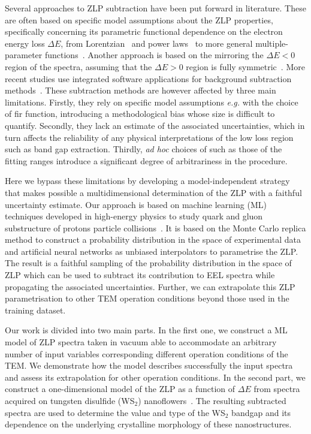 Several approaches to ZLP subtraction\cite{Rafferty:2000, Stoger:2008, Egerton:1996} have been put forward in literature.
%
These are often based on specific model assumptions about the ZLP properties, specifically
concerning its parametric functional dependence on the electron energy loss $\Delta E$,
from Lorentzian~\cite{Dorneich:1998}
and power laws~\cite{Erni:2005} to more general multiple-parameter functions~\cite{Benthem:2001}.
%
Another approach is based on the mirroring the $\Delta E <0$ region of the spectra, assuming
that the $\Delta E>0$ region is fully symmetric~\cite{Lazar:2003}.
%
More recent studies use integrated software applications for background subtraction 
methods~\cite{Egerton:10.1016/S0304-3991(01)00155-3, Held:2020, Granerod:2018, Fung:2020}.
%
These  subtraction methods are however affected by three main limitations.
%
Firstly, they rely on specific model assumptions {\it e.g.} with
the choice of fir function, introducing a methodological
bias whose size is difficult to quantify.
%
Secondly, they lack an estimate of the associated uncertainties, which in turn affects
the reliability of any physical interpretations of the low loss region such as
band gap extraction.
%
Thirdly, {\it ad hoc} choices of such as those of the fitting ranges introduce a significant degree of
arbitrariness in the procedure.

Here we bypass these limitations by developing a model-independent strategy
that makes possible a multidimensional determination of the ZLP
with a faithful uncertainty estimate.
%
Our approach is based on machine learning (ML) techniques
developed in high-energy physics to study
quark and gluon substructure of protons
particle collisions~\cite{Ball:2008by,Ball:2012cx,Ball:2014uwa,Ball:2017nwa}.
%
It is based on the  Monte Carlo replica  method to construct a probability
distribution in the space of experimental data and artificial
neural networks as unbiased interpolators to parametrise the ZLP.
%
The result is
a faithful sampling of the probability distribution in the space of ZLP
which can be used to subtract its contribution to EEL spectra while
propagating the associated uncertainties.
%
Further, we can extrapolate this ZLP parametrisation to other TEM
operation conditions beyond those used in the training dataset.

Our work is divided into two main parts.
%
In the first one, we construct a ML model of ZLP spectra taken
in vacuum able to accommodate an  arbitrary number of input
variables corresponding different  operation conditions of the TEM.
%
We demonstrate how the model describes successfully the
input spectra and assess its extrapolation for other operation
conditions.
%
In the second part, we construct a one-dimensional model
of the ZLP as a function of $\Delta E$ from spectra acquired on
tungsten disulfide (WS$_2$) nanoflowers~\cite{SabryaWS2}.
%
The resulting subtracted spectra are used to determine
the value and type of the WS$_2$ bandgap
and its dependence on the underlying crystalline morphology of these nanostructures.

